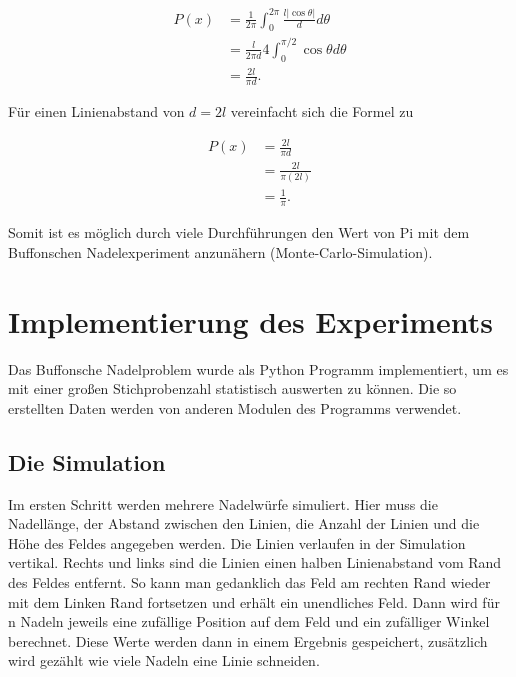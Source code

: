 \documentclass[10pt,twocolumn]{scrartcl}
\begin{document}
	\begin{align}
		P(x) &= \frac{1}{2\pi}\int_{0}^{2\pi}\frac{l|\cos{\theta}|}{d}d\theta \\ 
		&= \frac{l}{2 \pi d} 4 \int_{0}^{\pi/2}\cos{\theta}d\theta  \nonumber \\
		&= \frac{2l}{\pi d} \nonumber .
	\end{align}
	
	Für einen Linienabstand von $d=2l$ vereinfacht sich die Formel zu
	
	\begin{align}
		P(x) &= \frac{2l}{\pi d} \nonumber \\ 
		&= \frac{2l}{\pi (2l)} \nonumber \\
		&= \frac{1}{\pi} .
	\end{align}
	
	Somit ist es möglich durch viele Durchführungen den Wert von Pi mit dem Buffonschen Nadelexperiment anzunähern (Monte-Carlo-Simulation).

\section{Implementierung des Experiments}
	Das Buffonsche Nadelproblem wurde als Python\cite{Python} Programm implementiert, um es mit einer großen Stichprobenzahl statistisch auswerten zu können. Die so erstellten Daten werden von anderen Modulen des Programms verwendet.

	\subsection{Die Simulation}
		\label{chap_sim_results}
		Im ersten Schritt werden mehrere Nadelwürfe simuliert. Hier muss die Nadellänge, der Abstand zwischen den Linien, die Anzahl der Linien und die Höhe des Feldes angegeben werden. Die Linien verlaufen in der Simulation vertikal. Rechts und links sind die Linien einen halben Linienabstand vom Rand des Feldes entfernt. So kann man gedanklich das Feld am rechten Rand wieder mit dem Linken Rand fortsetzen und erhält ein unendliches Feld. Dann wird für n Nadeln jeweils eine zufällige Position auf dem Feld und ein zufälliger Winkel berechnet. Diese Werte werden dann in einem Ergebnis gespeichert, zusätzlich wird gezählt wie viele Nadeln eine Linie schneiden.
\end{document}
